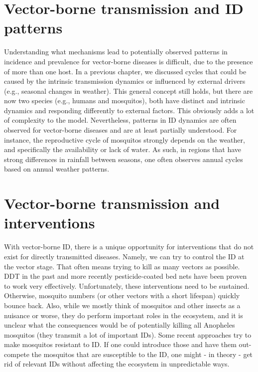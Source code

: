 \documentclass[
]{book}
\begin{document}
\hypertarget{vector-borne-transmission-and-id-patterns}{%
\section{Vector-borne transmission and ID patterns}\label{vector-borne-transmission-and-id-patterns}}

Understanding what mechanisms lead to potentially observed patterns in incidence and prevalence for vector-borne diseases is difficult, due to the presence of more than one host. In a previous chapter, we discussed cycles that could be caused by the intrinsic transmission dynamics or influenced by external drivers (e.g., seasonal changes in weather). This general concept still holds, but there are now two species (e.g., humans and mosquitos), both have distinct and intrinsic dynamics and responding differently to external factors. This obviously adds a lot of complexity to the model. Nevertheless, patterns in ID dynamics are often observed for vector-borne diseases and are at least partially understood. For instance, the reproductive cycle of mosquitos strongly depends on the weather, and specifically the availability or lack of water. As such, in regions that have strong differences in rainfall between seasons, one often observes annual cycles based on annual weather patterns.

\hypertarget{vector-borne-transmission-and-interventions}{%
\section{Vector-borne transmission and interventions}\label{vector-borne-transmission-and-interventions}}

With vector-borne ID, there is a unique opportunity for interventions that do not exist for directly transmitted diseases. Namely, we can try to control the ID at the vector stage. That often means trying to kill as many vectors as possible. DDT in the past and more recently pesticide-coated bed nets have been proven to work very effectively. Unfortunately, these interventions need to be sustained. Otherwise, mosquito numbers (or other vectors with a short lifespan) quickly bounce back. Also, while we mostly think of mosquitos and other insects as a nuisance or worse, they do perform important roles in the ecosystem, and it is unclear what the consequences would be of potentially killing all Anopheles mosquitos (they transmit a lot of important IDs). Some recent approaches try to make mosquitos resistant to ID. If one could introduce those and have them out-compete the mosquitos that are susceptible to the ID, one might - in theory - get rid of relevant IDs without affecting the ecosystem in unpredictable ways.
\end{document}
